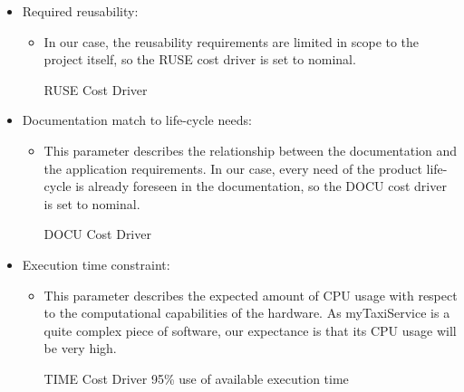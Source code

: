 \begin{itemize}
	\item Required reusability: 
	\begin{itemize}
	\item[] In our case, the reusability requirements are limited in scope to the project itself, so the RUSE cost driver is set to nominal.
	\begin{costdriverstable}{RUSE Cost Driver}
		\hline
	\end{costdriverstable}
	\end{itemize}
\end{itemize}

\begin{itemize}
	\item Documentation match to life-cycle needs: 
	\begin{itemize}
	\item[] This parameter describes the relationship between the  documentation and the application requirements. In our case, every need of the product life-cycle is already foreseen in the documentation, so the DOCU cost driver is set to nominal.
	\begin{costdriverstable}{DOCU Cost Driver}
		\hline
	\end{costdriverstable}
	\end{itemize}
\end{itemize}

\begin{itemize}
	\item Execution time constraint: 
	\begin{itemize}
	\item[] This parameter describes the expected amount of CPU usage with respect to the computational capabilities of the hardware. As myTaxiService is a quite complex piece of software, our expectance is that its CPU usage will be very high.
	\begin{costdriverstable}{TIME Cost Driver}
		 {95\% use of available execution time}\hline
	\end{costdriverstable}
	\end{itemize}
\end{itemize}

